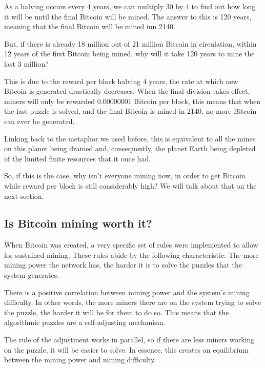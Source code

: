\documentclass{article}
\newcommand\tab[1][1cm]{\hspace*{#1}}
\begin{document}
As a halving occurs every 4 years, we can multiply 30 by 4 to find out how long it will be until the final Bitcoin will be mined. The answer to this is 120 years, meaning that the final Bitcoin will be mined inn 2140.

But, if there is already 18 million out of 21 million Bitcoin in circulation, within 12 years of the first Bitcoin being mined, why will it take 120 years to mine the last 3 million?

This is due to the reward per block halving 4 years, the rate at which new Bitcoin is generated drastically decreases. When the final division takes effect, miners will only be rewarded 0.00000001 Bitcoin per block, this means that when the last puzzle is solved, and the final Bitcoin is mined in 2140, no more Bitcoin can ever be generated.

Linking back to the metaphor we used before, this is equivalent to all the mines on this planet being drained and, consequently, the planet Earth being depleted of the limited finite resources that it once had.

So, if this is the case, why isn't everyone mining now, in order to get Bitcoin while reward per block is still considerably high? We will talk about that on the next section.

\subsection{Is Bitcoin mining worth it?}

\tab When Bitcoin was created, a very specific set of rules were implemented to allow for sustained mining. These rules abide by the following characteristic: The more mining power the network has, the harder it is to solve the puzzles that the system generates.

There is a positive correlation between mining power and the system's mining difficulty. In other words, the more miners there are on the system trying to solve the puzzle, the harder it will be for them to do so. This means that the algorithmic puzzles are a self-adjusting mechanism.

The rule of the adjustment works in parallel, so if there are less miners working on the puzzle, it will be easier to solve. In essence, this creates an equilibrium between the mining power and mining difficulty.
\end{document}
